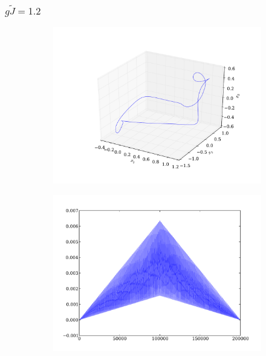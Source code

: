 \documentclass{beamer}
\begin{document}

\begin{frame}
\frametitle{$g\tilde{J} = 1.2$}
\begin{figure}
	\centering
	\begin{subfigure}[b]{0.49\textwidth}
		\includegraphics[width=\textwidth]{paulfigs/J_1_2_3d}
	\end{subfigure}
	\begin{subfigure}[b]{0.49\textwidth}
		\includegraphics[width=\textwidth]{paulfigs/tcorr_J_1_2}
	\end{subfigure}
\end{figure}
\end{frame}
\end{document}
